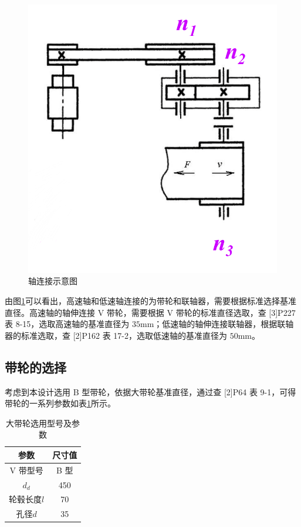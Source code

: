 \documentclass[12pt]{ctexart}
\begin{document}
\begin{figure}[htbp]
    \centering
    \includegraphics[scale=0.2]{dynamic_argument.png}
    \caption{轴连接示意图}\label{figure7}
\end{figure}

由图\ref{figure7}可以看出，高速轴和低速轴连接的为带轮和联轴器，需要根据标准选择基准直径。高速轴的轴伸连接 V 带轮，需要根据 V 带轮的标准直径选取，查 [3]P227 表 8-15，选取高速轴的基准直径为 $35\text{mm}$；低速轴的轴伸连接联轴器，根据联轴器的标准选取，查 [2]P162 表 17-2，选取低速轴的基准直径为 $50\text{mm}$。

\subsection{带轮的选择}

考虑到本设计选用 B 型带轮，依据大带轮基准直径，通过查 [2]P64 表 9-1，可得带轮的一系列参数如表\ref{table27}所示。

\begin{table}[htbp]
    \centering
    \setlength{\belowcaptionskip}{0.3cm}
    \caption{大带轮选用型号及参数}
    \begin{tabular}{c c}
        \toprule
        参数 & 尺寸值 \\
        \midrule
        V 带型号         & B 型 \\
        $d_d$           & 450 \\
        轮毂长度$l$     & 70 \\
        孔径$d$         & 35 \\
        \bottomrule
    \end{tabular}
    
    \label{table27}
\end{table}
\end{document}
